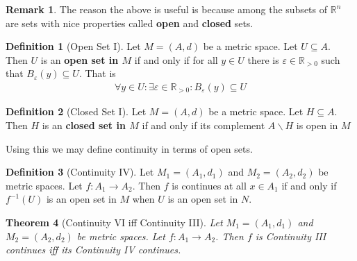 \documentclass{article}
\theoremstyle{plain}
\newtheorem{theorem}{Theorem}
\theoremstyle{definition}
\newtheorem*{remark}{Remark}
\newtheorem{definition}[theorem]{Definition}
\newcommand{\R}{\mathbb{R}}
\begin{document}
\begin{remark}
	The reason the above is useful is because among the subsets of $\R^n$ are
	sets with nice properties called \textbf{open} and \textbf{closed} sets.
\end{remark}
\begin{definition}[Open Set I]
	Let $M=(A,d)$ be a metric space. Let $U\subseteq A$. Then $U$ is an
	\textbf{open set in $M$} if and only if for all $y\in U$ there is
	$\varepsilon\in\R_{>0}$ such that $B_{\varepsilon}(y)\subseteq U$. That is
	\begin{equation}
	\begin{aligned}
		\forall y\in U:\exists\varepsilon\in\R_{>0}: 
		B_{\varepsilon}(y)\subseteq U
	\end{aligned}
	\end{equation}
\end{definition}
\begin{definition}[Closed Set I]
	Let $M=(A,d)$ be a metric space. Let $H\subseteq A$. Then $H$ is an
	\textbf{closed set in $M$} if and only if its complement $A\backslash H$ is
	open in $M$
\end{definition}
Using this we may define continuity in terms of open sets.
\begin{definition}[Continuity IV]
	Let $M_1=(A_1,d_1)$ and $M_2=(A_2,d_2)$ be metric spaces. Let
	$f:A_1\rightarrow A_2$. Then $f$ is continues at all $x\in A_1$
	if and only if $f^{-1}(U)$ is an open set in $M$ when $U$ is an
	open set in $N$.
\end{definition}
\begin{theorem}[Continuity VI iff Continuity III]
	Let $M_1=(A_1,d_1)$ and $M_2=(A_2,d_2)$ be metric spaces. Let
	$f:A_1\rightarrow A_2$. Then $f$ is Continuity III continues iff its
	Continuity IV continues.
\end{theorem}
\end{document}
